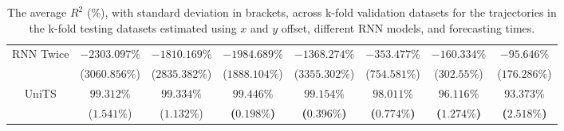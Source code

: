 \begin{table}[!ht]
{\begin{tabular}{|c|c|c|c|c|c|c|c|}
			\multirow{2}{*}{RNN Twice} & $-2303.097\%$ & $-1810.169\%$ & $-1984.689\%$ & $-1368.274\%$ & $-353.477\%$ & $-160.334\%$ & $-95.646\%$ \\
			 & ($3060.856\%$) & ($2835.382\%$) & ($1888.104\%$) & ($3355.302\%$) & ($754.581\%$) & ($302.55\%$) & ($176.286\%$) \\ \hline
			\multirow{2}{*}{UniTS} & $99.312\%$ & $99.334\%$ & $\mathbf{99.446\%}$ & $\mathbf{99.154\%}$ & $\mathbf{98.011\%}$ & $\mathbf{96.116\%}$ & $\mathbf{93.373\%}$ \\
			 & ($1.541\%$) & ($1.132\%$) & \textbf{(}$\mathbf{0.198\%}$\textbf{)} & \textbf{(}$\mathbf{0.396\%}$\textbf{)} & \textbf{(}$\mathbf{0.774\%}$\textbf{)} & \textbf{(}$\mathbf{1.274\%}$\textbf{)} & \textbf{(}$\mathbf{2.518\%}$\textbf{)} \\ \hline
		\end{tabular}
	}
	\caption{The average $R^{2}$ (\%), with standard deviation in brackets, across k-fold validation datasets for the trajectories in the k-fold testing datasets estimated using $x$ and $y$ offset, different RNN models, and forecasting times.}
	\label{tab:all_no_abs_R2}
\end{table}

